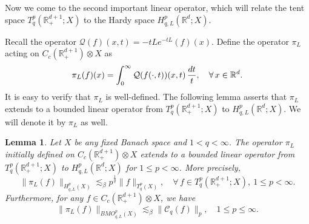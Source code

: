 \documentclass[oneside,english,a4wide]{amsart}
\numberwithin{equation}{section}
\numberwithin{figure}{section}
\theoremstyle{plain}
\theoremstyle{plain}
\theoremstyle{definition}
\theoremstyle{plain}
\newtheorem{lemma}[thm]{Lemma}
\theoremstyle{remark}
\theoremstyle{definition}
\theoremstyle{remark}
\theoremstyle{definition}
\newcommand{\real}{{\mathbb R}}
\newcommand{\A}{{\mathcal A}}
\newcommand{\M}{{\mathcal M}}
\newcommand{\Q}{{\mathcal Q}}
\newcommand{\e}{\varepsilon}
\newcommand{\8}{+\infty}
\renewcommand{\1}{\mathbbm{1}}
\newcommand{\wh}{\widehat}
\newcommand\mk[1]{ \left[ #1 \right] }
\renewcommand\d{{\rm d}}
\begin{document}
{%






Now we come to the second important linear operator, which will relate the tent space $T^p_q(\real^{d+1}_+; X)$ to the Hardy space $H^p_{q, L}(\real^d; X)$.


Recall the operator $\Q(f)(x, t) = -tLe^{-tL}(f)(x)$. Define the operator $\pi_L$ acting on $C_c(\real^{d+1}_+)\otimes X$ as
\[
    \pi_L(f)(x) = \int_{0}^{\infty} \Q (f(\cdot, t))(x, t) \,\frac{\d t}{t}, \quad \forall\, x \in \real^d.
\]
It is easy to verify that $\pi_L$ is well-defined. 
The following lemma asserts that $\pi_L$ extends to a bounded linear operator from $T^p_q(\real^{d+1}_+; X)$ to $H^p_{q, L}(\real^d; X)$. We will denote it by $\pi_L$ as well. 

\begin{lemma}\label{l3.8}
Let $X$ be any fixed Banach space and $1<q<\infty$. The operator $\pi_L$ initially defined on $C_c(\real^{d+1}_+)\otimes X$ extends to a bounded linear operator from $T^p_q(\real^{d+1}_+; X)$ to $H^p_{q, L}(\real^d; X)$ for $1 \leq p < \infty$. More precisely,
    \[
        \| \pi_L(f) \|_{H^p_{q, L}(X)} \lesssim_{\beta} p^{\frac{1}{q}}\| f \|_{T^p_q(X)}, \quad \forall\, f \in T^p_q(\real^{d+1}_+;X), \ 1 \leq p < \infty.
    \]
    Furthermore, for any $f \in C_c(\real^{d+1}_+)\otimes X$, we have
    \[
        \| \pi_L(f) \|_{BMO^p_{q, L}(X)} \lesssim_{\beta} \| \mathcal{C}_q(f) \|_{p}, \quad 1 \leq p \leq \infty.
    \]
\end{lemma}

}
\end{document}
